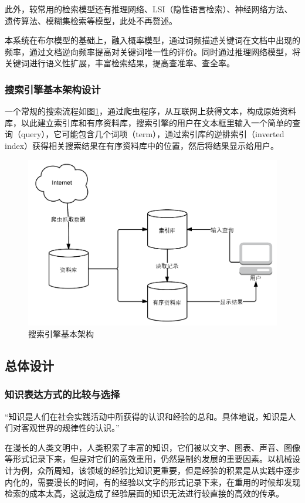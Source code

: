 \documentclass[12pt,a4paper]{article}
\newcommand{\wuhao}{\fontsize{10.5pt}{\baselineskip}\selectfont}
\begin{document}
	此外，较常用的检索模型还有推理网络、{\Times LSI}（隐性语言检索）、神经网络方法、遗传算法、模糊集检索等模型，此处不再赘述。
		
	本系统在布尔模型的基础上，融入概率模型，通过词频描述关键词在文档中出现的频率，通过文档逆向频率提高对关键词唯一性的评价。同时通过推理网络模型，将关键词进行语义性扩展，丰富检索结果，提高查准率、查全率。
		\subsubsection{搜索引擎基本架构设计}
	一个常规的搜索流程如图\ref{fig:basicStructure}，通过爬虫程序，从互联网上获得文本，构成原始资料库，以此建立索引库和有序资料库，搜索引擎的用户在文本框里输入一个简单的查询（{\Times query}），它可能包含几个词项（{\Times term}），通过索引库的逆排索引（{\Times inverted index}）获得相关搜索结果在有序资料库中的位置，然后将结果显示给用户。
		
	\begin{figure}[htbp] 
	\centering\includegraphics[width=5in]{fig/basicStructure.png} 
	\caption{\wuhao 搜索引擎基本架构}\label{fig:basicStructure} 
	\end{figure} 
		
	\subsection{总体设计}
		\subsubsection{知识表达方式的比较与选择}
	“知识是人们在社会实践活动中所获得的认识和经验的总和。具体地说，知识是人们对客观世界的规律性的认识。”\cite{Chen2010}
	
	在漫长的人类文明中，人类积累了丰富的知识，它们被以文字、图表、声音、图像等形式记录下来，但是对它们的高效重用，仍然是制约发展的重要因素。以机械设计为例，众所周知，该领域的经验比知识更重要，但是经验的积累是从实践中逐步内化的，需要漫长的时间，有的经验以文字的形式记录下来，在重用的时候却发现检索的成本太高，这就造成了经验层面的知识无法进行较直接的高效的传承。
	
\end{document}
